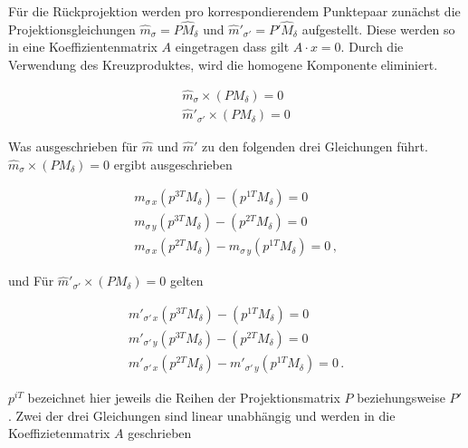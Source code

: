 Für die Rückprojektion werden pro korrespondierendem Punktepaar zunächst die Projektionsgleichungen  $\hat{m}_\sigma = P\hat{M}_\delta$ und $\hat{m}'_{\sigma'}  = P'\hat{M}_\delta$ aufgestellt. Diese werden so in eine Koeffizientenmatrix $A$ eingetragen dass gilt $A\cdot x = 0$. Durch die Verwendung des Kreuzproduktes, wird die homogene Komponente eliminiert\cite{HZ}. 




\begin{gather}
	\hat{m}_\sigma \times (PM_\delta) = 0\\
	\hat{m}'_{\sigma'} \times (PM_\delta) = 0
\end{gather}

Was ausgeschrieben für $\hat{m}$ und $\hat{m}'$ zu den folgenden drei Gleichungen führt. $\hat{m}_\sigma \times (PM_\delta) = 0$ ergibt ausgeschrieben

\begin{gather}
m_{\sigma\,x}(p^{3T}M_\delta) - (p^{1T}M_\delta)=0\\
m_{\sigma\,y}(p^{3T}M_\delta) - (p^{2T}M_\delta)=0\\
m_{\sigma\,x}(p^{2T}M_\delta) - m_{\sigma\,y}(p^{1T}M_\delta)=0 \, ,
\end{gather}

und Für $\hat{m}'_{\sigma'} \times (PM_\delta) = 0$ gelten


\begin{gather}
	m'_{\sigma'\,x}(p^{3T}M_\delta) - (p^{1T}M_\delta)=0\\
	m'_{\sigma'\,y}(p^{3T}M_\delta) - (p^{2T}M_\delta)=0\\
	m'_{\sigma'\,x}(p^{2T}M_\delta) - m'_{\sigma'\,y}(p^{1T}M_\delta)=0 \, .
\end{gather}

$p^{iT}$ bezeichnet hier jeweils die Reihen der Projektionsmatrix $P$ beziehungsweise $P'$. Zwei der drei Gleichungen sind linear unabhängig und werden in die Koeffizietenmatrix $A$ geschrieben 


